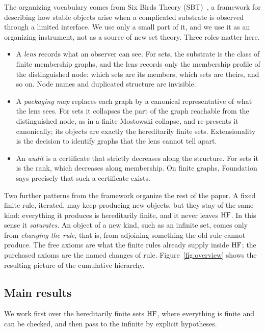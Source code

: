 The organizing vocabulary comes from Six Birds Theory (\textsc{SBT})~\citep{SBTFoundationsI}, a
framework for describing how stable objects arise when a complicated substrate is observed
through a limited interface. We use only a small part of it, and we use it as an organizing
instrument, not as a source of new set theory. Three roles matter here.
\begin{itemize}[itemsep=2pt,topsep=3pt]
\item A \emph{lens} records what an observer can see. For sets, the substrate is the class of
finite membership graphs, and the lens records only the membership profile of the distinguished
node: which sets are its members, which sets are theirs, and so on. Node names and duplicated
structure are invisible.
\item A \emph{packaging map} replaces each graph by a canonical representative of what the lens
sees. For sets it collapses the part of the graph reachable from the distinguished node, as in
a finite Mostowski collapse, and re-presents it canonically; its objects are exactly the
hereditarily finite sets. Extensionality is the decision to identify graphs that the lens cannot tell apart.
\item An \emph{audit} is a certificate that strictly decreases along the structure. For sets it
is the rank, which decreases along membership. On finite graphs, Foundation says precisely that
such a certificate exists.
\end{itemize}
Two further patterns from the framework organize the rest of the paper. A fixed finite rule,
iterated, may keep producing new objects, but they stay of the same kind: everything it produces
is hereditarily finite, and it never leaves $\mathrm{HF}$. In this sense it \emph{saturates}. An object
of a new kind, such as an infinite set, comes only from \emph{changing the rule}, that is, from
adjoining something the old rule cannot produce. The free axioms are what the finite rules
already supply inside $\mathrm{HF}$; the purchased axioms are the named changes of rule. Figure~\ref{fig:overview} shows the resulting picture of the cumulative
hierarchy.



\subsection{Main results}

We work first over the hereditarily finite sets $\mathrm{HF}$, where everything is finite and can be
checked, and then pass to the infinite by explicit hypotheses.

